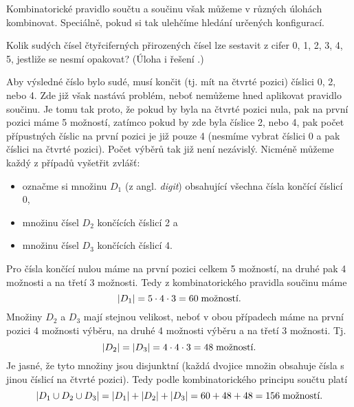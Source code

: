 Kombinatorické pravidlo součtu a součinu však můžeme v různých úlohách kombinovat. Speciálně, pokud si tak ulehčíme hledání určených konfigurací.

\begin{task}
    Kolik sudých čísel čtyřciferných přirozených čísel lze sestavit z cifer 0, 1, 2, 3, 4, 5, jestliže se nesmí opakovat? (Úloha i řešení \citep[str. 8]{Slavik2022}.)
\end{task}
\begin{solution}
    Aby výsledné číslo bylo sudé, musí končit (tj. mít na čtvrté pozici) číslici 0, 2, nebo 4. Zde již však nastává problém, neboť nemůžeme hned aplikovat pravidlo součinu. Je tomu tak proto, že pokud by byla na čtvrté pozici nula, pak na první pozici máme 5 možností, zatímco pokud by zde byla číslice 2, nebo 4, pak počet přípustných číslic na první pozici je již pouze 4 (nesmíme vybrat číslici 0 a pak číslici na čtvrté pozici). Počet výběrů tak již není nezávislý. Nicméně můžeme každý z případů vyšetřit zvlášť:
    \begin{itemize}
        \item označme si množinu $D_1$ (z angl. \emph{digit}) obsahující všechna čísla končící číslicí 0,
        \item množinu čísel $D_2$ končících číslicí 2 a
        \item množinu čísel $D_3$ končících číslicí 4.
    \end{itemize}
    Pro čísla končící nulou máme na první pozici celkem 5 možností, na druhé pak 4 možnosti a na třetí 3 možnosti. Tedy z kombinatorického pravidla součinu máme
    \begin{equation*}
        \left| D_1 \right|=5\cdot 4\cdot 3=60\;\text{možností.}
    \end{equation*}
    Množiny $D_2$ a $D_3$ mají stejnou velikost, neboť v obou případech máme na první pozici 4 možnosti výběru, na druhé 4 možnosti výběru a na třetí 3 možnosti. Tj.
    \begin{equation*}
        \left| D_2 \right|=\left| D_3 \right|=4\cdot 4\cdot 3=48\;\text{možností.}
    \end{equation*}
    Je jasné, že tyto množiny jsou disjunktní (každá dvojice množin obsahuje čísla s jinou číslicí na čtvrté pozici). Tedy podle kombinatorického principu součtu platí
    \begin{equation*}
        \left| D_1\cup D_2\cup D_3 \right|=\left| D_1 \right|+\left| D_2 \right|+\left| D_3 \right|=60+48+48=156\;\text{možností.}
    \end{equation*}
\end{solution}